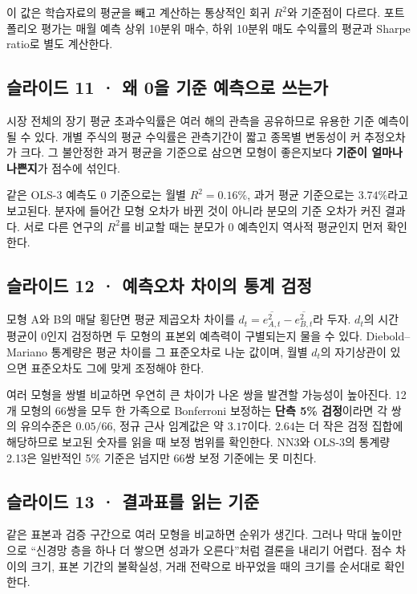 \documentclass[11pt,a4paper]{article}
\begin{document}
이 값은 학습자료의 평균을 빼고 계산하는 통상적인 회귀 $R^2$와 기준점이 다르다. 포트폴리오 평가는 매월 예측 상위 10분위 매수, 하위 10분위 매도 수익률의 평균과 Sharpe ratio로 별도 계산한다.\par

\subsection{슬라이드 11 · 왜 0을 기준 예측으로 쓰는가}
시장 전체의 장기 평균 초과수익률은 여러 해의 관측을 공유하므로 유용한 기준 예측이 될 수 있다. 개별 주식의 평균 수익률은 관측기간이 짧고 종목별 변동성이 커 추정오차가 크다. 그 불안정한 과거 평균을 기준으로 삼으면 모형이 좋은지보다 \textbf{기준이 얼마나 나쁜지}가 점수에 섞인다.\par

같은 OLS-3 예측도 0 기준으로는 월별 $R^2=0.16\%$, 과거 평균 기준으로는 $3.74\%$라고 보고된다. 분자에 들어간 모형 오차가 바뀐 것이 아니라 분모의 기준 오차가 커진 결과다. 서로 다른 연구의 $R^2$를 비교할 때는 분모가 0 예측인지 역사적 평균인지 먼저 확인한다.\par

\subsection{슬라이드 12 · 예측오차 차이의 통계 검정}
모형 A와 B의 매달 횡단면 평균 제곱오차 차이를 $d_t=\overline{e_{A,t}^2}-\overline{e_{B,t}^2}$라 두자. $d_t$의 시간 평균이 0인지 검정하면 두 모형의 표본외 예측력이 구별되는지 물을 수 있다. Diebold–Mariano 통계량은 평균 차이를 그 표준오차로 나눈 값이며, 월별 $d_t$의 자기상관이 있으면 표준오차도 그에 맞게 조정해야 한다.\par

여러 모형을 쌍별 비교하면 우연히 큰 차이가 나온 쌍을 발견할 가능성이 높아진다. 12개 모형의 66쌍을 모두 한 가족으로 Bonferroni 보정하는 \textbf{단측 5\% 검정}이라면 각 쌍의 유의수준은 $0.05/66$, 정규 근사 임계값은 약 $3.17$이다. $2.64$는 더 작은 검정 집합에 해당하므로 보고된 숫자를 읽을 때 보정 범위를 확인한다. NN3와 OLS-3의 통계량 2.13은 일반적인 5\% 기준은 넘지만 66쌍 보정 기준에는 못 미친다.\par

\subsection{슬라이드 13 · 결과표를 읽는 기준}
같은 표본과 검증 구간으로 여러 모형을 비교하면 순위가 생긴다. 그러나 막대 높이만으로 “신경망 층을 하나 더 쌓으면 성과가 오른다”처럼 결론을 내리기 어렵다. 점수 차이의 크기, 표본 기간의 불확실성, 거래 전략으로 바꾸었을 때의 크기를 순서대로 확인한다.\par
\end{document}
